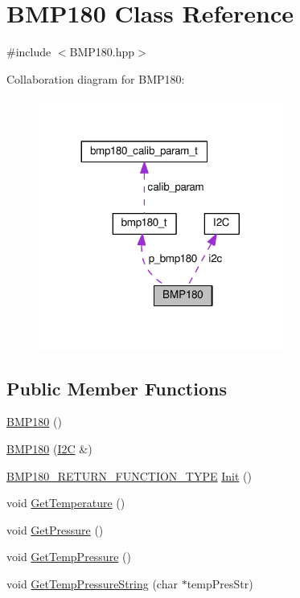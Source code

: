 \hypertarget{classBMP180}{}\section{B\+M\+P180 Class Reference}
\label{classBMP180}


{\ttfamily \#include $<$B\+M\+P180.\+hpp$>$}



Collaboration diagram for B\+M\+P180\+:\nopagebreak
\begin{figure}[H]
\begin{center}
\leavevmode
\includegraphics[width=227pt]{classBMP180__coll__graph}
\end{center}
\end{figure}
\subsection*{Public Member Functions}
\begin{DoxyCompactItemize}
\item 
\hyperlink{classBMP180_a8c3e89c7ea65e49c0001a43af07b7c35}{B\+M\+P180} ()
\item 
\hyperlink{classBMP180_a124111338db49a31f3f716ebe657a83b}{B\+M\+P180} (\hyperlink{classI2C}{I2C} \&)
\item 
\hyperlink{BMP180_8hpp_a0b2541dda714686ae536954aaf5c3387}{B\+M\+P180\+\_\+\+R\+E\+T\+U\+R\+N\+\_\+\+F\+U\+N\+C\+T\+I\+O\+N\+\_\+\+T\+Y\+PE} \hyperlink{classBMP180_aa7171a079dc6e99158839fd5fe3d40cd}{Init} ()
\item 
void \hyperlink{classBMP180_a27de00d6188de674c1973a7181287f6f}{Get\+Temperature} ()
\item 
void \hyperlink{classBMP180_aee70a553dc17d04696c8a5cc7458f2dd}{Get\+Pressure} ()
\item 
void \hyperlink{classBMP180_a804923af8373a2faffc72f01da637bf8}{Get\+Temp\+Pressure} ()
\item 
void \hyperlink{classBMP180_adcef92ebb205aad908b4f93a54fd313f}{Get\+Temp\+Pressure\+String} (char $\ast$temp\+Pres\+Str)
\end{DoxyCompactItemize}
